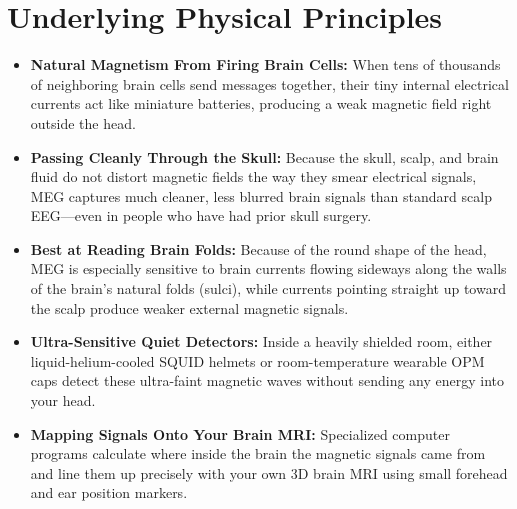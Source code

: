 \section{Underlying Physical Principles}
\begin{itemize}
  \item \textbf{Natural Magnetism From Firing Brain Cells:} When tens of thousands of neighboring brain cells send messages together, their tiny internal electrical currents act like miniature batteries, producing a weak magnetic field right outside the head.
  \item \textbf{Passing Cleanly Through the Skull:} Because the skull, scalp, and brain fluid do not distort magnetic fields the way they smear electrical signals, MEG captures much cleaner, less blurred brain signals than standard scalp EEG---even in people who have had prior skull surgery.
  \item \textbf{Best at Reading Brain Folds:} Because of the round shape of the head, MEG is especially sensitive to brain currents flowing sideways along the walls of the brain's natural folds (sulci), while currents pointing straight up toward the scalp produce weaker external magnetic signals.
  \item \textbf{Ultra-Sensitive Quiet Detectors:} Inside a heavily shielded room, either liquid-helium-cooled SQUID helmets or room-temperature wearable OPM caps detect these ultra-faint magnetic waves without sending any energy into your head.
  \item \textbf{Mapping Signals Onto Your Brain MRI:} Specialized computer programs calculate where inside the brain the magnetic signals came from and line them up precisely with your own 3D brain MRI using small forehead and ear position markers.
\end{itemize}

